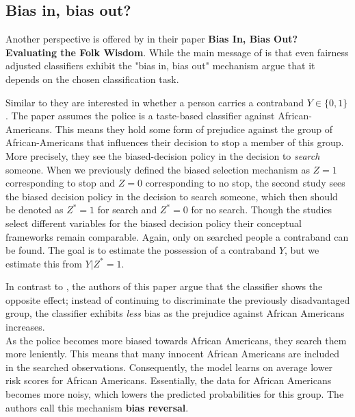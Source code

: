 \subsection{Bias in, bias out?}

Another perspective is offered by \cite{rambachan2016} in their paper \textbf{Bias In, Bias Out? Evaluating the Folk Wisdom}.
While the main message of \cite{kallus2018} is that even fairness adjusted classifiers exhibit the "bias in, bias out" mechanism \cite{rambachan2016} argue that it depends on the chosen classification task.

Similar to \cite{kallus2018} they are interested in whether a person carries a contraband $Y \in \{0, 1\}$. The paper assumes the police is a taste-based classifier against African-Americans. This means they hold some form of prejudice against the group of African-Americans that influences their decision to stop a member of this group. More precisely, they see the biased-decision policy in the decision to \textit{search} someone. When we previously defined the biased selection mechanism as $Z=1$ corresponding to stop and $Z=0$ corresponding to no stop, the second study sees the biased decision policy in the decision to search someone, which then should be denoted as $Z^*=1$ for search and $Z^*=0$ for no search. Though the studies select different variables for the biased decision policy their conceptual frameworks remain comparable.
Again, only on searched people a contraband can be found. The goal is to estimate the possession of a contraband $Y$, but we estimate this from $Y | Z^*=1$.\par

In contrast to \cite{kallus2018}, the authors of this paper argue that the classifier shows the opposite effect; instead of continuing to discriminate the previously disadvantaged group, the classifier exhibits \textit{less} bias as the prejudice against African Americans increases.\\
As the police becomes more biased towards African Americans, they search them more leniently. This means that many innocent African Americans are included in the searched observations. Consequently, the model learns on average lower risk scores for African Americans. Essentially, the data for African Americans becomes more noisy, which lowers the predicted probabilities for this group. The authors call this mechanism \textbf{bias reversal}.

